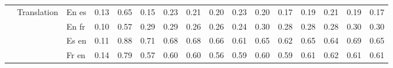 \begin{center}
\begin{longtable}{lllrrrrrrrrrrrrr}
\cline{2-16}
 & \multirow[t]{4}{*}{Translation} & En es & 0.13 & 0.65 & 0.15 & 0.23 & 0.21 & 0.20 & 0.23 & 0.20 & 0.17 & 0.19 & 0.21 & 0.19 & 0.17 \\
 &  & En fr & 0.10 & 0.57 & 0.29 & 0.29 & 0.26 & 0.26 & 0.24 & 0.30 & 0.28 & 0.28 & 0.28 & 0.30 & 0.30 \\
 &  & Es en & 0.11 & 0.88 & 0.71 & 0.68 & 0.68 & 0.66 & 0.61 & 0.65 & 0.62 & 0.65 & 0.64 & 0.69 & 0.65 \\
 &  & Fr en & 0.14 & 0.79 & 0.57 & 0.60 & 0.60 & 0.56 & 0.59 & 0.60 & 0.59 & 0.61 & 0.62 & 0.61 & 0.61 \\
\cline{1-16} \cline{2-16}
\bottomrule
\end{longtable}

\end{center}
\twocolumn